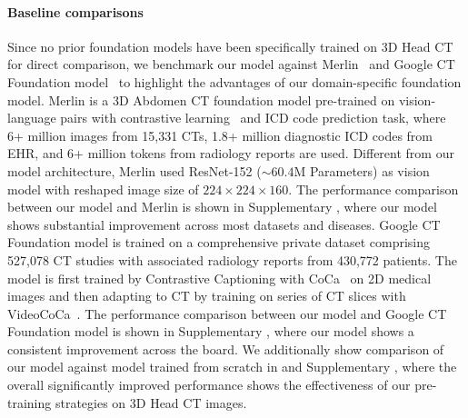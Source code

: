 \documentclass[fleqn,10pt]{wlscirep}
\begin{document}
\paragraph{Baseline comparisons}
Since no prior foundation models have been specifically trained on 3D Head CT for direct comparison, we benchmark our model against Merlin~\cite{blankemeier2024merlinvisionlanguagefoundation} and Google CT Foundation model~\cite{yang2024advancingmultimodalmedicalcapabilities} to highlight the advantages of our domain-specific foundation model. Merlin is a 3D Abdomen CT foundation model pre-trained on vision-language pairs with contrastive learning~\cite{radford2021learningtransferablevisualmodels} and ICD code prediction task, where 6+ million images from 15,331 CTs, 1.8+ million diagnostic ICD codes from EHR, and 6+ million tokens from radiology reports are used. Different from our model architecture, Merlin used ResNet-152 ($\sim60.4$M Parameters) as vision model with reshaped image size of $224\times224\times160$. The performance comparison between our model and Merlin is shown in Supplementary , where our model shows substantial improvement across most datasets and diseases. Google CT Foundation model is trained on a comprehensive private dataset comprising 527,078 CT studies with associated radiology reports from 430,772 patients. The model is first trained by Contrastive Captioning with CoCa~\cite{yu2022coca} on 2D medical images and then adapting to CT by training on series of CT slices with VideoCoCa~\cite{yan2023videococavideotextmodelingzeroshot}. The performance comparison between our model and Google CT Foundation model is shown in Supplementary , where our model shows a consistent improvement across the board. We additionally show comparison of our model against model trained from scratch in  and Supplementary , where the overall significantly improved performance shows the effectiveness of our pre-training strategies on 3D Head CT images.
\end{document}
